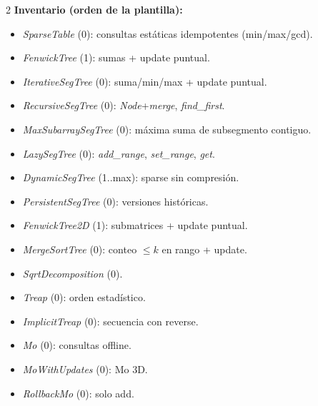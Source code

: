 \documentclass[10pt]{article}
\begin{document}
\begin{multicols}{2}
\textbf{Inventario (orden de la plantilla):}
\begin{itemize}\setlength{\itemsep}{1pt}
  \item \textit{SparseTable} (0): consultas estáticas idempotentes (min/max/gcd).
  \item \textit{FenwickTree} (1): sumas + update puntual.
  \item \textit{IterativeSegTree} (0): suma/min/max + update puntual.
  \item \textit{RecursiveSegTree} (0): \textit{Node}+\textit{merge}, \textit{find\_first}.
  \item \textit{MaxSubarraySegTree} (0): máxima suma de subsegmento contiguo.
  \item \textit{LazySegTree} (0): \textit{add\_range}, \textit{set\_range}, \textit{get}.
  \item \textit{DynamicSegTree} (1..max): sparse sin compresión.
  \item \textit{PersistentSegTree} (0): versiones históricas.
  \item \textit{FenwickTree2D} (1): submatrices + update puntual.
  \item \textit{MergeSortTree} (0): conteo $\le k$ en rango + update.
  \item \textit{SqrtDecomposition} (0).
  \item \textit{Treap} (0): orden estadístico.
  \item \textit{ImplicitTreap} (0): secuencia con reverse.
  \item \textit{Mo} (0): consultas offline.
  \item \textit{MoWithUpdates} (0): Mo 3D.
  \item \textit{RollbackMo} (0): solo add.
\end{itemize}


\end{multicols}
\end{document}
